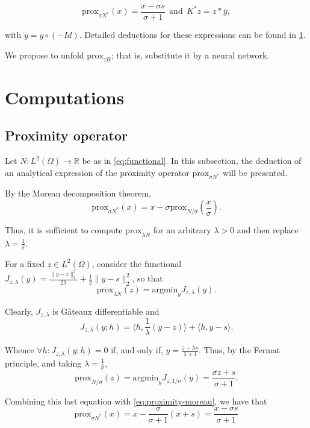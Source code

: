 \documentclass{article}
\begin{document}
\begin{equation}\label{eq:primal_dual/analytical}
  \text{prox}_{\sigma N^*}(x) = \frac{x-\sigma s}{\sigma + 1} ~~ \text{and} ~~ K^*z = z\ast \overline{y},
\end{equation}

with \(\overline{y}= y\circ(-Id)\). Detailed deductions for these expressions can be found in \cref{sec:computations}.

We propose to unfold \(\text{prox}_{\tau R}\); that is, substitute it by a neural network.

\section{Computations}\label{sec:computations}
\subsection{Proximity operator}
Let \(N\colon L^2(\Omega)\to \mathbb{R}\) be as in \cref{eq:functional}. In this subsection, the deduction of an analytical expression of the proximity operator \(\text{prox}_{\sigma N^*}\) will be presented.

By the Moreau decomposition theorem,
\begin{equation}\label{eq:proximity-moreau}
  \text{prox}_{\sigma N^*}(x) = x - \sigma\text{prox}_{N/\sigma}\left(\frac x\sigma\right).
\end{equation}

Thus, it is sufficient to compute \(\text{prox}_{\lambda N}\) for an arbitrary \(\lambda > 0\) and then replace \(\lambda = \frac 1\sigma\).

For a fixed \(z\in L^2(\Omega)\), consider the functional \(J_{z, \lambda}(y) = \frac{\|y - z\|_{2}^2}{2\lambda} + \frac12 \|y - s\|_{2}^2\), so that
\[
  \text{prox}_{\lambda N}(z) = \text{argmin}_{y}J_{z, \lambda}(y)
.\]

Clearly, \(J_{z, \lambda}\) is Gâteaux differentiable and
\[
  J_{z, \lambda}(y; h) = \langle h, \frac 1\lambda(y-z)\rangle + \langle h, y-s\rangle
.\]

Whence \(\forall h\colon J_{z, \lambda}(y; h) = 0\) if, and only if, \(y=\frac{z + \lambda s}{\lambda + 1}\). Thus, by the Fermat principle, and taking \(\lambda = \frac 1\sigma\),
\[
  \text{prox}_{N / \sigma}(z) = \text{argmin}_{y}J_{z, 1/\sigma}(y) = \frac{\sigma z+ s}{\sigma + 1}
.\]

Combining this last equation with \cref{eq:proximity-moreau}, we have that
\begin{equation}\label{eq:proximity/final}
  \text{prox}_{\sigma N^*}(x) = x -\frac{\sigma}{\sigma + 1}(x+s) = \frac{x - \sigma s}{\sigma + 1}
\end{equation}
\end{document}
